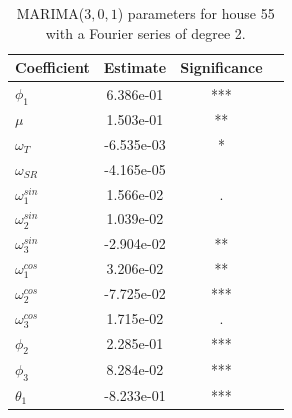      \begin{table}
        \centering
        \begin{tabular}{l|ccc}
        \hline
        Coefficient & Estimate & Significance\\ \hline \hline
        $\phi_1$ & 6.386e-01 & *** \\
        $\mu$ & 1.503e-01 & ** \\
        $\omega_{T}$ & -6.535e-03 & * \\
        $\omega_{SR}$ & -4.165e-05 &  \\
        $\omega^{sin}_1$ & 1.566e-02 & . \\
        $\omega^{sin}_2$ & 1.039e-02 & \\
        $\omega^{sin}_3$ & -2.904e-02 & **\\
        $\omega^{cos}_1$ & 3.206e-02 & ** \\
        $\omega^{cos}_2$ & -7.725e-02 & *** \\
        $\omega^{cos}_3$ & 1.715e-02 & . \\
        $\phi_2$ & 2.285e-01 & *** \\
        $\phi_3$ & 8.284e-02 & *** \\
        $\theta_1$ & -8.233e-01 & *** \\
        \hline
        \end{tabular}
        \caption{MARIMA($3,0,1$) parameters for house 55 with a Fourier series of degree 2.}
        \label{tab: MARIMAparam55_fourier}
     \end{table}
    

